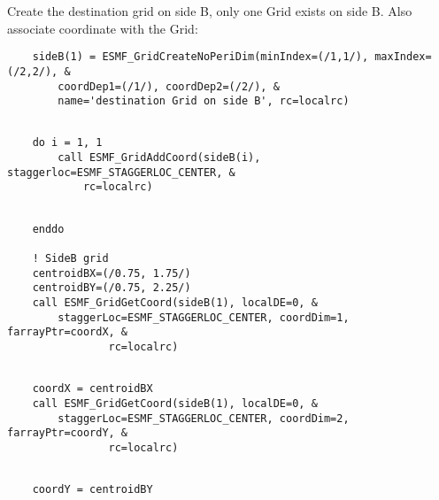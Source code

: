 
   Create the destination grid on side B, only one Grid exists on side B. Also associate
   coordinate with the Grid: 

 \begin{verbatim}
    sideB(1) = ESMF_GridCreateNoPeriDim(minIndex=(/1,1/), maxIndex=(/2,2/), &
        coordDep1=(/1/), coordDep2=(/2/), &
        name='destination Grid on side B', rc=localrc)
 
\end{verbatim}
 

 \begin{verbatim}
    do i = 1, 1
        call ESMF_GridAddCoord(sideB(i), staggerloc=ESMF_STAGGERLOC_CENTER, &
            rc=localrc)
 
\end{verbatim}
 

 \begin{verbatim}
    enddo

    ! SideB grid
    centroidBX=(/0.75, 1.75/)
    centroidBY=(/0.75, 2.25/)
    call ESMF_GridGetCoord(sideB(1), localDE=0, &
        staggerLoc=ESMF_STAGGERLOC_CENTER, coordDim=1, farrayPtr=coordX, &
                rc=localrc)
 
\end{verbatim}
 

 \begin{verbatim}
    coordX = centroidBX
    call ESMF_GridGetCoord(sideB(1), localDE=0, &
        staggerLoc=ESMF_STAGGERLOC_CENTER, coordDim=2, farrayPtr=coordY, &
                rc=localrc)
 
\end{verbatim}
 

 \begin{verbatim}
    coordY = centroidBY
 
\end{verbatim}
 

